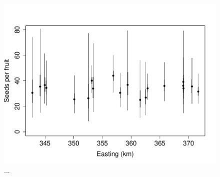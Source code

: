 \documentclass[12pt, oneside, titlepage]{article}   	%
\begin{document}
 \begin{figure}[h]
   \centering
       \includegraphics[page=1,width=1\textwidth]{../figures/spatial-seedsPerFruit.pdf}  
    \caption{ ... }
 \label{fig:test}
\end{figure}
\end{document}
